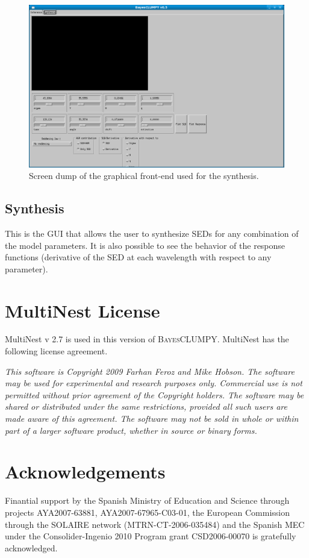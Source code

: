 \documentclass[12pt]{article}
\def\B{\textsc{BayesCLUMPY}}
\begin{document}
\begin{figure}[!t]
\includegraphics[scale=0.5]{snapshot2.png}
\caption{Screen dump of the graphical front-end used for the synthesis.
\label{fig:synthesis_GUI}}
\end{figure}

\subsection{Synthesis}
This is the GUI that allows the user to synthesize SEDs for any combination of the model
parameters. It is also possible to see the behavior of the response functions (derivative
of the SED at each wavelength with respect to any parameter).

\section{MultiNest License}

MultiNest v 2.7 is used in this version of \B. MultiNest has the following license agreement.

\emph{This software is Copyright 2009 Farhan Feroz and Mike Hobson. The software
may be used for experimental and research purposes only. Commercial use is
not permitted without prior agreement of the Copyright holders. The
software may be shared or distributed under the same restrictions, provided
all such users are made aware of this agreement. The software may not be
sold in whole or within part of a larger software product, whether in
source or binary forms.}


\section*{Acknowledgements}
Finantial support by
the Spanish Ministry of Education and Science through projects AYA2007-63881, AYA2007-67965-C03-01,
the European Commission through the SOLAIRE network (MTRN-CT-2006-035484) and the
Spanish MEC under the Consolider-Ingenio 2010 Program grant CSD2006-00070 is gratefully acknowledged. 

% 
% 
\end{document}
